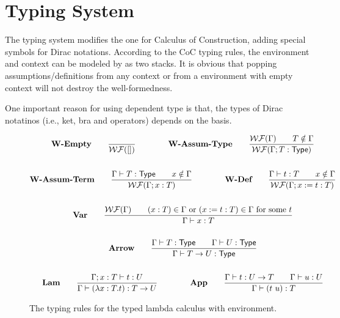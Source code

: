 \documentclass{article}
\begin{document}
\section{Typing System}
The typing system modifies the one for Calculus of Construction, adding special symbols for Dirac notations.
According to the CoC typing rules, the environment and context can be modeled by as two stacks. It is obvious that popping assumptions/definitions from any context or from a environment with empty context will not destroy the well-formedness.

One important reason for using dependent type is that, the types of Dirac notatinos (i.e., ket, bra and operators) depends on the basis.


\begin{figure}[h]
    \begin{gather*}
        \textbf{W-Empty} \qquad
        \frac{}{\mathcal{WF}([])}
        \qquad \qquad
        \textbf{W-Assum-Type} \qquad
        \frac{\mathcal{WF}(\Gamma) \qquad T \notin \Gamma}{\mathcal{WF}(\Gamma; T:\mathsf{Type})}\\
        \\
        \textbf{W-Assum-Term} \qquad
        \frac{\Gamma\vdash T:\mathsf{Type} \qquad x \notin \Gamma}{\mathcal{WF}(\Gamma; x:T)}
        \qquad \qquad
        \textbf{W-Def} \qquad
        \frac{\Gamma\vdash t:T \qquad x \notin \Gamma}{\mathcal{WF}(\Gamma; x:=t:T)} \\
        \\
        \textbf{Var} \qquad
        \frac{\mathcal{WF}(\Gamma) \qquad (x:T) \in \Gamma \text{ or } (x := t : T) \in \Gamma \text{ for some $t$}}{\Gamma \vdash x : T} \\
        \\
        \textbf{Arrow} \qquad
        \frac{\Gamma \vdash T:\mathsf{Type} \qquad \Gamma \vdash U:\mathsf{Type}}{\Gamma \vdash T \to U : \mathsf{Type}} \\
        \\
        \textbf{Lam} \qquad
        \frac{\Gamma;x:T \vdash t : U}{\Gamma \vdash (\lambda x:T . t) : T \to U}
        \qquad \qquad
        \textbf{App} \qquad
        \frac{\Gamma \vdash t:U \to T \qquad \Gamma \vdash u:U}{\Gamma \vdash (t\ u):T}
    \end{gather*}
    \caption{The typing rules for the typed lambda calculus with environment.}
\end{figure}
\end{document}
